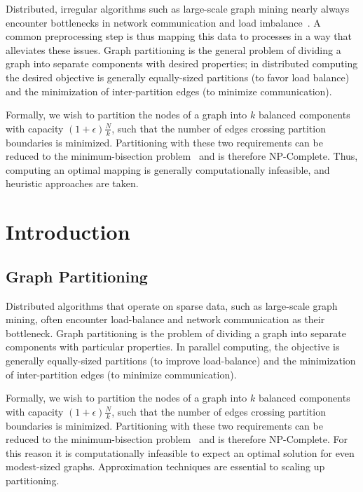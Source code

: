 
Distributed, irregular algorithms such as large-scale graph mining nearly always encounter bottlenecks in network communication and load imbalance~\cite{challenglums}. A common preprocessing step is thus mapping this data to processes in a way that alleviates these issues. Graph partitioning is the general problem of dividing a graph into separate components with desired properties; in distributed computing the desired objective is generally equally-sized partitions (to favor load balance) and the minimization of inter-partition edges (to minimize communication).

Formally, we wish to partition the nodes of a graph into $k$ balanced components with capacity $(1+\epsilon)\frac{N}{k}$, such that the number of edges crossing partition boundaries is minimized. Partitioning with these two requirements can be reduced to the minimum-bisection problem~\cite{Garey:1979:CIG:578533} and is therefore NP-Complete. Thus, computing an optimal mapping is generally computationally infeasible, and heuristic approaches are taken. 

\section{Introduction}
\subsection{Graph Partitioning}
Distributed algorithms that operate on sparse data, such as large-scale graph mining, often encounter load-balance and network communication as their bottleneck. 
Graph partitioning is the problem of dividing a graph into separate components with particular properties. 
In parallel computing, the objective is generally equally-sized partitions (to improve load-balance) and the minimization of inter-partition edges (to minimize communication).

Formally, we wish to partition the nodes of a graph into $k$ balanced components with capacity $(1+\epsilon)\frac{N}{k}$, such that the number of edges crossing partition boundaries is minimized. 
Partitioning with these two requirements can be reduced to the minimum-bisection problem~\cite{Garey:1979:CIG:578533} and is therefore NP-Complete. 
For this reason it is computationally infeasible to expect an optimal solution for even modest-sized graphs.
Approximation techniques are essential to scaling up partitioning.

